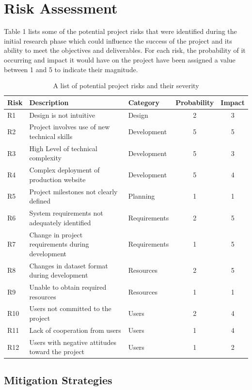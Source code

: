 \documentclass[12pt,a4paper]{article}
\begin{document}
\section{Risk Assessment}

Table 1 lists some of the potential project risks that were identified during
the initial research phase which could influence the success of the project and
its ability to meet the objectives and deliverables. For each risk, the
probability of it occurring and impact it would have on the project have been
assigned a value between 1 and 5 to indicate their magnitude.

\begin{table}[ht]
\centering
\begin{tabular}{ | l | l | l || c | c | }
\hline
Risk & Description & Category & Probability & Impact\\
\hline
R1  & Design is not intuitive                           & Design       & 2 & 3\\
R2  & Project involves use of new technical skills      & Development  & 5 & 5\\
R3  & High Level of technical complexity                & Development  & 5 & 3\\
R4  & Complex deployment of production website          & Development  & 5 & 4\\
R5  & Project milestones not clearly defined            & Planning     & 1 & 1\\
R6  & System requirements not adequately identified     & Requirements & 2 & 5\\
R7  & Change in project requirements during development & Requirements & 1 & 5\\
R8  & Changes in dataset format during development      & Resources    & 2 & 5\\
R9  & Unable to obtain required resources               & Resources    & 1 & 1\\
R10 & Users not committed to the project                & Users        & 2 & 4\\
R11 & Lack of cooperation from users                    & Users        & 1 & 4\\
R12 & Users with negative attitudes toward the project  & Users        & 1 & 2\\
\hline
\end{tabular}
\caption{A list of potential project risks and their severity}
\label{tab:risk-assessment}
\end{table}

\subsection{Mitigation Strategies}
\end{document}
